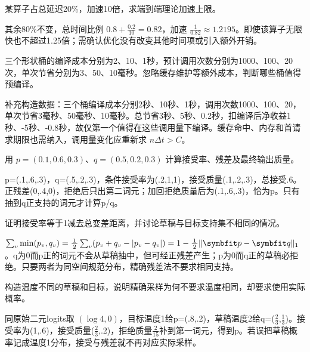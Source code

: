 \begin{exercises}
\begin{exercise} 某算子占总延迟20\%，加速10倍，求端到端理论加速上限。

\begin{solution}
其余80\%不变，总时间比例 $0.8+\frac{0.2}{10}=0.82$，加速 $\frac{1}{0.82}\approx1.2195$。即使该算子无限快也不超过1.25倍；需确认优化没有改变其他时间项或引入额外开销。
\end{solution}
\end{exercise}

\begin{exercise} 三个形状桶的编译成本分别为2、10、1秒，预计调用次数分别为1000、100、20次，单次节省分别为3、50、10毫秒。忽略缓存维护等额外成本，判断哪些桶值得预编译。

\begin{solution}
补充构造数据：三个桶编译成本分别2秒、10秒、1秒，调用次数1000、100、20，单次节省3毫秒、50毫秒、10毫秒。总节省3秒、5秒、0.2秒，扣编译后净收益1秒、-5秒、-0.8秒，故仅第一个值得在这些调用量下编译。缓存命中、内存和首请求期限也需纳入，调用量变化应重新求 $n\Delta t>C$。
\end{solution}
\end{exercise}

\begin{exercise} 用 $p=(0.1,0.6,0.3)$、$q=(0.5,0.2,0.3)$ 计算接受率、残差及最终输出质量。

\begin{solution}
p=(.1,.6,.3)，q=(.5,.2,.3)，条件接受率为(.2,1,1)，接受质量(.1,.2,.3)，总接受.6。正残差(0,.4,0)，拒绝后只出第二词元；加回拒绝质量后为(.1,.6,.3)，恰为p。只有抽到q正支持的词元才计算p/q。
\end{solution}
\end{exercise}

\begin{exercise}\optional 证明接受率等于1减去总变差距离，并讨论草稿与目标支持集不相同的情况。

\begin{solution}
$\sum_v\min(p_v,q_v)=\frac12\sum_v(p_v+q_v-|p_v-q_v|)=1-\frac12\|\vect{p}-\vect{q}\|_1$。q为0而p正的词元不会从草稿抽中，但可经正残差产生；p为0而q正的草稿必拒绝。只要两者为同空间规范分布，精确残差法不要求相同支持。
\end{solution}
\end{exercise}

\begin{exercise} 构造温度不同的草稿和目标，说明精确采样为何不要求温度相同，却要求使用实际概率。

\begin{solution}
同原始二元logits取 $(\log4,0)$，目标温度1给p=(.8,.2)，草稿温度2给q=($\frac{2}{3}$,$\frac{1}{3}$)。接受率为(1,.6)，接受质量($\frac{2}{3}$,.2)，拒绝质量$\frac{2}{15}$补到第一词元，得到p。若误把草稿概率记成温度1分布，接受与残差就不再对应实际采样。
\end{solution}
\end{exercise}


\end{exercises}
